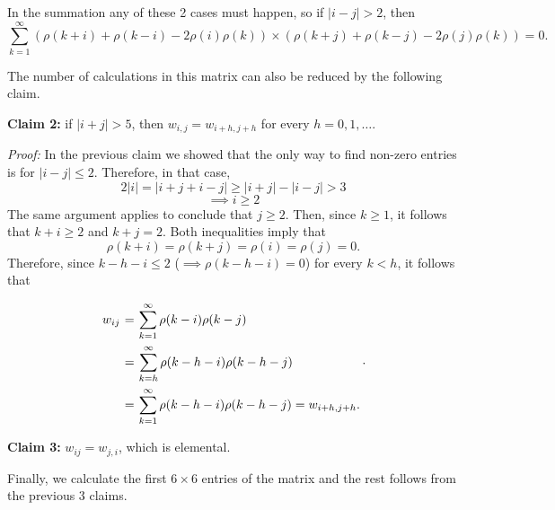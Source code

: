 In the summation any of these 2 cases must happen, so if $|i-j| > 2$, then
\[ \sum_{k = 1}^{\infty}(\rho(k+i)+\rho(k-i)-2\rho(i)\rho(k)) \times (\rho(k+j)+\rho(k-j)-2\rho(j)\rho(k)) = 0. \]

The number of calculations in this matrix can also be reduced by the following claim.

\textbf{Claim 2:} if $|i+j| > 5$, then $w_{i,j} = w_{i+h,j+h}$ for every $h = 0,1,\ldots $.

\textit{Proof:} In the previous claim we showed that the only way to find non-zero entries is for $|i-j| \leq 2$. Therefore, in that case,
\[ 2|i| = |i+j+i-j| \geq |i+j| - |i-j| > 3  \]
\[ \implies i \geq 2 \]
The same argument applies to conclude that $j \geq 2$. Then, since $k \geq 1$, it follows that $k+i \geq 2$ and $k+j = 2$. Both inequalities imply that 
\[ \rho(k+i) = \rho(k+j) = \rho(i) = \rho(j) = 0. \]
Therefore, since $k-h-i \leq 2$ ($\implies \rho(k-h-i) = 0$) for every $k < h$, it follows that
\[ \everymath{\displaystyle}
\arraycolsep=1.8pt\def\arraystretch{2.5}
\begin{array}{rcl}
    w_{ij} & = & \sum_{k = 1}^{\infty} \rho(k-i) \rho(k-j)\\
    & = & \sum_{k = h}^{\infty} \rho(k-h-i) \rho(k-h-j)\\
    & = & \sum_{k = 1}^{\infty} \rho(k-h-i) \rho(k-h-j) = w_{i+h,j+h}.
\end{array}. \]

\textbf{Claim 3:} $w_{ij} = w_{j,i}$, which is elemental.

Finally, we calculate the first $6\times 6$ entries of the matrix and the rest follows from the previous 3 claims.

